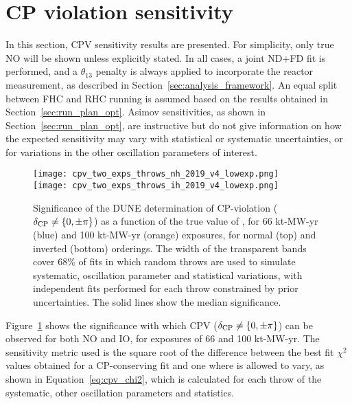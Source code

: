 \FloatBarrier
\section{CP violation sensitivity}
\label{sec:cp_sens}

In this section, CPV sensitivity results are presented. For simplicity, only true NO will be shown unless explicitly stated. In all cases, a joint ND+FD fit is performed, and a $\theta_{13}$ penalty is always applied to incorporate the reactor measurement, as described in Section~\ref{sec:analysis_framework}. An equal split between FHC and RHC running is assumed based on the results obtained in Section~\ref{sec:run_plan_opt}. Asimov sensitivities, as shown in Section~\ref{sec:run_plan_opt}, are instructive but do not give information on how the expected sensitivity may vary with statistical or systematic uncertainties, or for variations in the other oscillation parameters of interest.

\begin{figure}[htbp]
  \centering
  \texttt{[image: cpv\_two\_exps\_throws\_nh\_2019\_v4\_lowexp.png]}\\
  \texttt{[image: cpv\_two\_exps\_throws\_ih\_2019\_v4\_lowexp.png]}
  \caption{Significance of the DUNE determination of CP-violation ($\delta_{\rm CP} \neq \{0,\pm\pi\}$) as a function of the true value of \deltacp, for 66 kt-MW-yr (blue) and 100 kt-MW-yr (orange) exposures, for normal (top) and inverted (bottom) orderings. The width of the transparent bands cover 68\% of fits in which random throws are used to simulate systematic, oscillation parameter and statistical variations, with independent fits performed for each throw constrained by prior uncertainties. The solid lines show the median significance.}
  \label{fig:cpv_bands}
\end{figure}
Figure~\ref{fig:cpv_bands} shows the significance with which CPV ($\delta_{\rm CP} \neq \{0,\pm\pi\}$) can be observed for both NO and IO, for exposures of 66 and 100 kt-MW-yr.  The sensitivity metric used is the square root of the difference between the best fit $\chi^{2}$ values obtained for a CP-conserving fit and one where \deltacp is allowed to vary, as shown in Equation~\ref{eq:cpv_chi2}, which is calculated for each throw of the systematic, other oscillation parameters and statistics. %

